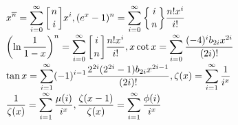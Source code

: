 ${\displaystyle x^{\overline{n}} = \sum_{i=0}^\infty \bigg[{n \atop i} \bigg] x^i, (e^x - 1)^n = \sum_{i=0}^\infty \bigg\{{i \atop n} \bigg\} {n! x^i \over i!}}$\\
${\displaystyle \left(\ln {1 \over 1 -x}\right)^n = \sum_{i=0}^\infty \bigg[{i \atop n} \bigg] {n! x^i \over i!}, x \cot x = \sum_{i=0}^\infty {(-4)^i b_{2i} x^{2i} \over (2i)!}}$\\
${\displaystyle \tan x = \sum_{i=1}^\infty (-1)^{i-1}{2^{2i} (2^{2i} - 1) b_{2i} x^{2i-1} \over (2i)!}, \zeta(x) = \sum_{i=1}^\infty {1 \over i^x}}$\\
${\displaystyle {1 \over \zeta(x)} = \sum_{i=1}^\infty {\mu(i) \over i^x}, {\zeta(x-1) \over \zeta(x)} = \sum_{i=1}^\infty {\phi(i) \over i^x}}$\\